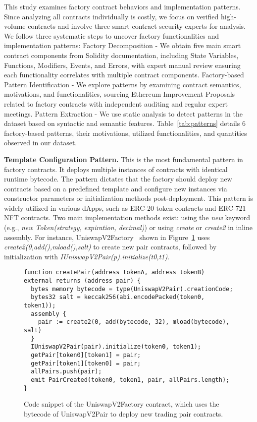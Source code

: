 \documentclass[acmsmall, screen]{acmart}
\begin{document}
	This study examines factory contract behaviors and implementation patterns. Since analyzing all
	contracts individually is costly, we focus on verified high-volume contracts and involve three smart
	contract security experts for analysis. We follow three systematic steps to uncover factory
	functionalities and implementation patterns:  Factory Decomposition - We obtain five
	main smart contract components from Solidity documentation, including State Variables, Functions,
	Modifiers, Events, and Errors, with expert manual review ensuring each functionality correlates
	with multiple contract components.  Factory-based Pattern Identification - We explore
	patterns by examining contract semantics, motivations, and functionalities, sourcing Ethereum Improvement
	Proposals related to factory contracts with independent auditing and regular expert meetings.
	 Pattern Extraction - We use static analysis to detect patterns in the dataset based on
	syntactic and semantic features. Table~\ref{tab:patterns} details 6 factory-based patterns, their
	motivations, utilized functionalities, and quantities observed in our dataset.

	\textbf{Template Configuration Pattern.} This is the most fundamental pattern in factory
	contracts. It deploys multiple instances of contracts with identical runtime bytecode. The
	pattern dictates that the factory should deploy new contracts based on a predefined template and
	configure new instances via constructor parameters or initialization methods post-deployment. This
	pattern is widely utilized in various dApps, such as ERC-20 token contracts and ERC-721 NFT
	contracts. Two main implementation methods exist: using the \textit{new} keyword (e.g., \textit{new
	Token(strategy, expiration, decimal)}) or using \textit{create} or \textit{create2} in inline
	assembly. For instance, UniswapV2Factory~\cite{uniswapv2factory} shown in Figure~\ref{list:uniswap}
	uses \textit{create2(0,add(),mload(),salt)} to create new pair contracts, followed by
	initialization with \textit{IUniswapV2Pair(p).initialize(t0,t1)}.
	

	\begin{figure}[h]
		\begin{minipage}{0.95\linewidth}
			\begin{lstlisting}
function createPair(address tokenA, address tokenB) external returns (address pair) {
  bytes memory bytecode = type(UniswapV2Pair).creationCode;
  bytes32 salt = keccak256(abi.encodePacked(token0, token1));
  assembly {
    pair := create2(0, add(bytecode, 32), mload(bytecode), salt)
  }
  IUniswapV2Pair(pair).initialize(token0, token1);
  getPair[token0][token1] = pair;
  getPair[token1][token0] = pair;
  allPairs.push(pair);
  emit PairCreated(token0, token1, pair, allPairs.length);
}
			\end{lstlisting}
		\end{minipage}
		\caption{Code snippet of the UniswapV2Factory contract, which uses the bytecode of UniswapV2Pair
		to deploy new trading pair contracts.}
		\label{list:uniswap}
	\end{figure}
\end{document}
